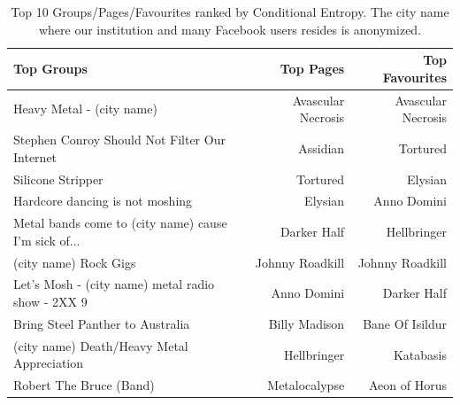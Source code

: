 %


\begin{table}[tbp!]
\centering
\begin{tabular}{| >{\small}l | >{\small}r | >{\small}r |}
\hline
\textbf{Top Groups} & \textbf{Top Pages} & \textbf{Top Favourites} \\
\hline
Heavy Metal - (city name) & Avascular Necrosis & Avascular Necrosis \\
Stephen Conroy Should Not Filter Our Internet & Assidian & Tortured \\
Silicone Stripper & Tortured & Elysian \\
Hardcore dancing is not moshing & Elysian & Anno Domini \\
Metal bands come to (city name) cause I'm sick of... & Darker Half & Hellbringer \\
(city name) Rock Gigs & Johnny Roadkill & Johnny Roadkill \\
Let's Mosh - (city name) metal radio show - 2XX 9 & Anno Domini & Darker Half \\
Bring Steel Panther to Australia & Billy Madison & Bane Of Isildur \\
(city name)  Death/Heavy Metal Appreciation & Hellbringer & Katabasis \\
Robert The Bruce (Band) & Metalocalypse & Aeon of Horus \\
\hline
\end{tabular}
\caption{Top 10 Groups/Pages/Favourites ranked by Conditional Entropy. The city name where our institution and many Facebook users resides is anonymized.}
\label {table:topGroupPagesFavs}
\end{table}

